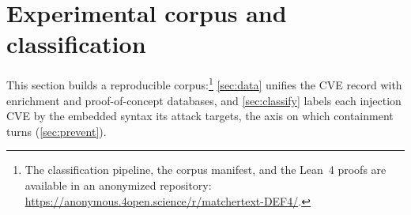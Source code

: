 \section{Experimental corpus and classification}
\label{sec:corpus}

This section builds a reproducible corpus:\footnote{The
classification pipeline, the corpus manifest, and the Lean~4 proofs are
available in an anonymized repository:
\url{https://anonymous.4open.science/r/matchertext-DEF4/}.}
\cref{sec:data} unifies the CVE record with enrichment and proof-of-concept
databases, and \cref{sec:classify} labels each injection CVE by the embedded
syntax its attack targets, the axis on which containment turns
(\cref{sec:prevent}).



